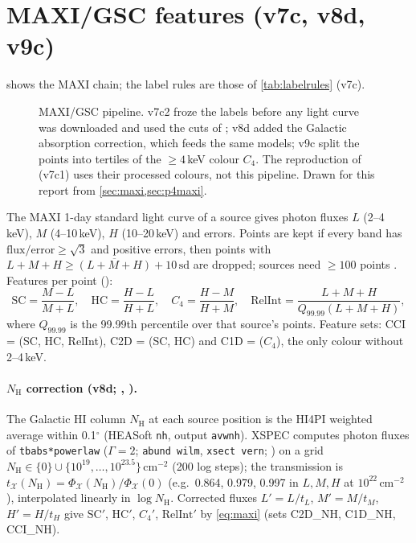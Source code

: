 \section{MAXI/GSC features (v7c, v8d, v9c)}\label{sec:maxi}

 shows the MAXI chain; the label rules are those of \cref{tab:labelrules} (v7c).

\begin{figure}[htbp]
\centering

\caption[MAXI pipeline]{MAXI/GSC pipeline. v7c2 froze the labels before any light curve was downloaded and used the cuts of
\citet{deBeurs2022}; v8d added the Galactic absorption correction, which feeds the same models; v9c split the points into
tertiles of the $\ge4$\,keV colour $C_4$. The reproduction of \citet{deBeurs2022} (v7c1) uses their processed colours, not this
pipeline. Drawn for this report from \cref{sec:maxi,sec:p4maxi}.}
\label{fig:maxiflow}
\end{figure}

The MAXI 1-day standard light curve of a source gives photon fluxes $L$ (2--4\,keV), $M$ (4--10\,keV), $H$
(10--20\,keV) and errors. Points are kept if every band has $\mathrm{flux}/\mathrm{error}\ge\sqrt3$ and positive
errors, then points with $L+M+H \ge \overline{(L+M+H)}+10\,\mathrm{sd}$ are dropped; sources need $\ge100$ points
\citep[cuts of][]{deBeurs2022}. Features per point ():
\begin{equation}
\mathrm{SC}=\frac{M-L}{M+L},\quad \mathrm{HC}=\frac{H-L}{H+L},\quad C_4=\frac{H-M}{H+M},\quad
\mathrm{RelInt}=\frac{L+M+H}{Q_{99.99}(L+M+H)} ,\label{eq:maxi}
\end{equation}
where $Q_{99.99}$ is the 99.99th percentile over that source's points. Feature sets: CCI = (SC, HC, RelInt), C2D = (SC, HC)
and C1D = ($C_4$), the only colour without 2--4\,keV.

\paragraph{$N_\mathrm{H}$ correction (v8d; , ).} The Galactic HI column
$N_\mathrm{H}$ at each source position is the HI4PI \citep{HI4PI2016} weighted average within 0.1$^\circ$ (HEASoft
\texttt{nh}, output \texttt{avwnh}). XSPEC computes photon fluxes of \texttt{tbabs*powerlaw} ($\Gamma=2$; \texttt{abund
wilm}, \texttt{xsect vern}; \citealt{Wilms2000}) on a grid $N_\mathrm{H}\in\{0\}\cup\{10^{19},\dots,10^{23.5}\}$\,cm$^{-2}$
(200 log steps); the transmission is $t_\mathcal{X}(N_\mathrm{H}) = \Phi_\mathcal{X}(N_\mathrm{H})/\Phi_\mathcal{X}(0)$
(e.g.\ 0.864, 0.979, 0.997 in $L,M,H$ at $10^{22}$\,cm$^{-2}$), interpolated linearly in $\log N_\mathrm{H}$. Corrected
fluxes $L'=L/t_L$, $M'=M/t_M$, $H'=H/t_H$ give $\mathrm{SC}'$, $\mathrm{HC}'$, $C_4'$, $\mathrm{RelInt}'$ by
\cref{eq:maxi} (sets C2D\_NH, C1D\_NH, CCI\_NH).

